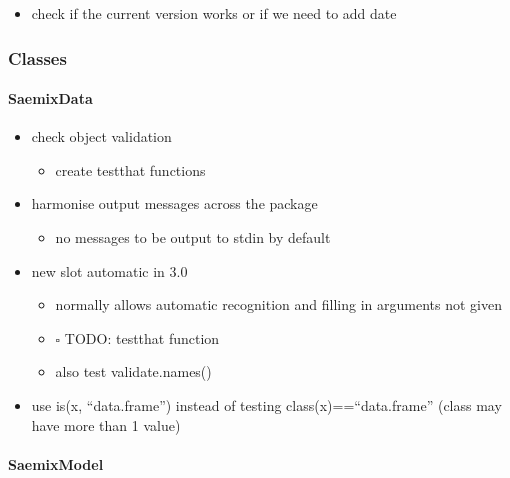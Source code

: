 \documentclass[
]{article}
\providecommand{\tightlist}{%
  \setlength{\itemsep}{0pt}\setlength{\parskip}{0pt}}
\begin{document}
\begin{itemize}
\tightlist
\item
  check if the current version works or if we need to add date
\end{itemize}

\hypertarget{classes}{%
\subsubsection{Classes}\label{classes}}

\hypertarget{saemixdata}{%
\paragraph{SaemixData}\label{saemixdata}}

\begin{itemize}
\tightlist
\item
  check object validation

  \begin{itemize}
  \tightlist
  \item
    create testthat functions
  \end{itemize}
\item
  harmonise output messages across the package

  \begin{itemize}
  \tightlist
  \item
    no messages to be output to stdin by default
  \end{itemize}
\item
  new slot automatic in 3.0

  \begin{itemize}
  \tightlist
  \item
    normally allows automatic recognition and filling in arguments not
    given
  \item
    \(\square\) TODO: testthat function
  \item
    also test validate.names()
  \end{itemize}
\item
  use is(x, ``data.frame'') instead of testing class(x)==``data.frame''
  (class may have more than 1 value)
\end{itemize}

\hypertarget{saemixmodel}{%
\paragraph{SaemixModel}\label{saemixmodel}}
\end{document}

